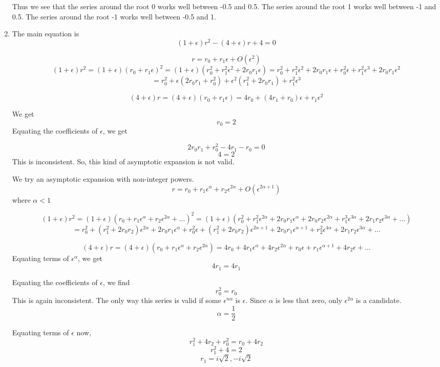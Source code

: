 \documentclass[a4paper]{article}
\begin{document}
\begin{enumerate}
\begin{figure}[H]
	    	\end{figure}

Thus we see that the series around the root 0 works well between -0.5 and 0.5. The series around the root 1 works well between -1 and 0.5. The series around the root -1 works well between -0.5 and 1.  	
	    	
\item
The main equation is 
\[(1+\epsilon)r^2-(4+\epsilon)r+4=0\]

\[r= r_0 +r_1 \epsilon +O(\epsilon^2)  \]
\[(1+\epsilon)r^2=(1+\epsilon)(r_0 +r_1 \epsilon)^2= (1+\epsilon)(r_0^2 +r_1^2\epsilon^2 +2r_0r_1\epsilon)= r_0^2 +r_1^2\epsilon^2 +2r_0r_1\epsilon + r_0^2\epsilon +r_1^2\epsilon^3 +2r_0r_1\epsilon^2 
\] \[ = r_0^2 +\epsilon(2r_0r_1+r_0^2)+\epsilon^2(r_1^2+2r_0r_1) +r_1^2\epsilon^3\]

\[(4+\epsilon)r =(4+\epsilon)(r_0 +r_1 \epsilon)= 4 r_0+ (4 r_1 +r_0)\epsilon +r_1 \epsilon^2 \]

We get
\[ r_0= 2\]
Equating the coefficients of $\epsilon$, we get

\[2r_0r_1+r_0^2 -4 r_1 -r_0=0\]
\[4=2\]
This is inconsistent. So, this kind of asymptotic expansion is not valid.

We try an asymptotic expansion with non-integer powers.
\[r= r_0 +r_1 \epsilon^\alpha +r_2 \epsilon^{2\alpha} +O(\epsilon^{2\alpha+1})\]
 where $\alpha<1$
 
\[(1+\epsilon)r^2=(1+\epsilon)(r_0 +r_1 \epsilon^\alpha+r_2 \epsilon^{2\alpha}+\ldots)^2= (1+\epsilon)(r_0^2 +r_1^2\epsilon^{2\alpha} +2r_0r_1\epsilon^\alpha + 2r_0r_2 \epsilon^{2\alpha} + r_1^3\epsilon^{3\alpha}+ 2r_1r_2\epsilon^{3\alpha}+\ldots)\]
\[= r_0^2 +(r_1^2+ 2r_0r_2)\epsilon^{2\alpha} +2r_0r_1\epsilon^{\alpha} + r_0^2\epsilon +(r_1^2+ 2r_0r_2)\epsilon^{2\alpha+1} +2r_0r_1\epsilon^{\alpha+1}
+ r_2^2\epsilon^{4\alpha}+ 2r_1r_2\epsilon^{3\alpha} +\ldots \]


\[(4+\epsilon)r =(4+\epsilon)(r_0 +r_1 \epsilon^\alpha +r_2 \epsilon^{2\alpha})= 4 r_0+ 4 r_1\epsilon^\alpha +4r_2\epsilon^{2\alpha}+r_0\epsilon +r_1 \epsilon^{\alpha+1}+4r_2\epsilon +\ldots\]
 Equating terms of $\epsilon^\alpha$, we get 
 \[4r_1=4r_1\]
 
Equating the coefficients of $\epsilon$, we find
\[r_0^2=r_0\]
This is again inconsistent. The only way this series is valid if some $ \epsilon^{n\alpha}$ is $\epsilon$. Since $\alpha$ is less that zero, only $\epsilon^{2\alpha}$ is a candidate.
 \[ \alpha = \frac{1}{2}\]
 
 Equating terms of $\epsilon$ now,
 \[ r_1^2+4 r_2+r_0^2=r_0+4r_2 \]
  \[r_1^2+4=2 \]
 \[r_1= i \sqrt2,-i\sqrt2\]


\end{enumerate}
\end{document}
